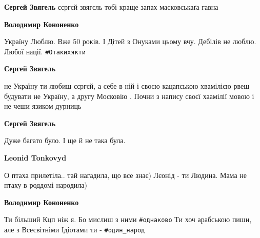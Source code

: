 \begin{itemize}
\begin{itemize}
\textbf{Сергей Звягель} сєргєй звягєль тобі краще запах масковськаґа гавна

 
\textbf{Володимир Кононенко} 

Україну Люблю. Вже 50 років. І Дітей з Онуками цьому вчу. Дебілів не люблю.
Любої нації. \verb|#Отакихякти|

 
\textbf{Сергей Звягель} 

не Україну ти любиш сєргєй, а себе в ній і своєю кацапською хвамілією рвеш
будувати не Україну, а другу Московію . Почни з напису своєї хаамілії мовою і
не чеши язиком дурниць


 
\textbf{Сергей Звягель} 

Дуже багато було. І ще й не така була.


 
\textbf{Leonid Tonkovyd} 

О птаха прилетіла.. тай нагадила, що все знає) Лєонід - ти Людина. Мама не
птаху в роддомі народила)

 
\textbf{Володимир Кононенко} 

Ти більший Кцп ніж я. Бо мислиш з ними \verb|#однаково| Ти хоч арабською пиши, але з
Всесвітніми Ідіотами ти - \verb|#один_народ|



\end{itemize}
\end{itemize}
